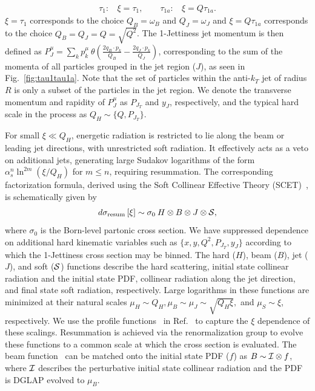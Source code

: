 \documentclass[prd,aps,nofootinbib,twocolumn,showpacs,amsmath,superscriptaddress]{revtex4-2}
\newcommand{\bea}{\begin{eqnarray}}
\newcommand{\eea}{\end{eqnarray}}
\begin{document}
\bea
\tau_1: \>\>\>\>\xi =\tau_1,  \qquad
\tau_{1a}: \>\>\>\> \xi = Q\tau_{1a}.
\eea
$\xi=\tau_1$ corresponds to the choice $Q_B=\omega_B$ and $Q_J=\omega_J$ and $\xi=Q\tau_{1a}$ corresponds to the choice $Q_B=Q_J=Q=\sqrt{Q^2}$. The 1-Jettiness jet momentum is then defined as $P_J^\mu= \sum_k p_k^\mu \>\theta (\frac{2q_B\cdot p_k}{Q_B} - \frac{2q_J\cdot p_k}{Q_J} )$, corresponding to the sum of the momenta of all particles grouped in the jet region ($J$), as seen in Fig.~\ref{fig:tau1tau1a}. Note that the set of particles within the anti-$k_T$ jet of radius $R$ is only a subset of the particles  in the jet region. We denote   the transverse momentum and rapidity of $P_J^\mu$ as $P_{J_T}$ and $y_J$, respectively, and the typical hard scale in the process as $Q_H\sim \{Q,P_{J_T}\}$.

For small $\xi \ll Q_H$,  energetic radiation is restricted to lie  along the beam or leading jet directions, with unrestricted soft radiation. It effectively acts as a veto on additional jets, generating large Sudakov logarithms of the form $\alpha_s^n\ln ^{2m}(\xi/Q_H)$ for $m\leq n$, requiring resummation. The corresponding factorization formula, derived using the Soft Collinear Effective Theory (SCET)~\cite{Bauer:2000ew,Bauer:2000yr,Bauer:2001ct,Bauer:2001yt,Bauer:2002nz,Beneke:2002ph}, is schematically given by~\cite{Kang:2012zr,Kang:2013wca,Kang:2013nha}
\bea
\label{eq:fac}
d\sigma_{\rm resum}\left[\xi \right ] \sim \sigma_0\> H\otimes B\otimes J \otimes {\cal S},
\eea
where $\sigma_0$ is the Born-level  partonic cross section. We have suppressed  dependence on additional hard kinematic variables such as $\{x,y, Q^2, P_{J_T},y_J\}$ according to which the 1-Jettiness cross section may be binned. The hard ($H$), beam ($B$), jet ($J$), and soft (${\cal S}$) functions describe  the hard scattering, initial state collinear radiation and the initial state PDF, collinear radiation along the jet direction, and final state soft radiation, respectively. Large logarithms in  these functions are minimized at their natural scales $\mu_H\sim Q_H, \mu_B\sim\mu_J\sim \sqrt{Q_H\xi},$ and $\mu_S\sim \xi$, respectively. We use the profile functions~\cite{Berger:2010xi,Stewart:2011cf} in Ref.~\cite{companion:2026} to capture the $\xi$ dependence of these scalings.  Resummation is achieved via the renormalization group to evolve these functions to a common scale at which the cross section is evaluated. The beam function~\cite{Stewart:2009yx} can be matched onto the initial state PDF ($f$) as $B\sim {\cal I}\otimes f$, where ${\cal I}$ describes the perturbative initial state collinear radiation and the PDF is DGLAP evolved to $\mu_B$.
\end{document}
